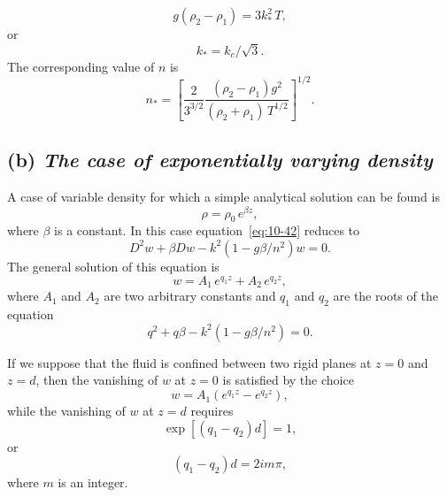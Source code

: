 \begin{equation}
\label{eq:10-53}
g(\rho_2-\rho_1) = 3k_*^2\,T,
\end{equation}
or
\begin{equation}
\label{eq:10-54}
k_* = k_c/\sqrt{3}.
\end{equation}
The corresponding value of $n$ is
\begin{equation}
\label{eq:10-55}
n_* = \left[\frac{2}{3^{3/2}}\frac{(\rho_2-\rho_1)g^2}{(\rho_2+\rho_1)\,T^{1/2}}\right]^{1/2}\!\!.
\end{equation}

\subsection*{(b) \textit{The case of exponentially varying density}}

A case of variable density for which a simple analytical solution can be found is
\begin{equation}
\label{eq:10-56}
\rho = \rho_0\,e^{\beta z},
\end{equation}
where $\beta$ is a constant. In this case equation~\eqref{eq:10-42} reduces to
\begin{equation}
\label{eq:10-57}
D^2w+\beta Dw - k^2(1-g\beta/n^2)w = 0.
\end{equation}
The general solution of this equation is
\begin{equation}
\label{eq:10-58}
w = A_1\,e^{q_1 z}+A_2\,e^{q_2 z},
\end{equation}
where $A_1$ and $A_2$ are two arbitrary constants and $q_1$ and $q_2$ are the roots of the equation
\begin{equation}
\label{eq:10-59}
q^2+q\beta - k^2(1-g\beta/n^2) = 0.
\end{equation}

If we suppose that the fluid is confined between two rigid planes at $z = 0$ and $z = d$, then the vanishing of $w$ at $z = 0$ is satisfied by the choice
\begin{equation}
\label{eq:10-60}
w = A_1(e^{q_1 z}-e^{q_2 z}),
\end{equation}
while the vanishing of $w$ at $z = d$ requires
\begin{equation}
\label{eq:10-61}
\exp[(q_1-q_2)d] = 1,
\end{equation}
or
\begin{equation}
\label{eq:10-62}
(q_1-q_2)d = 2im\pi,
\end{equation}
where $m$ is an integer.

